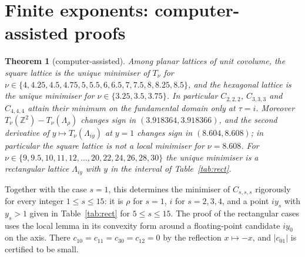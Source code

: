 \documentclass[10pt,twocolumn,a4paper]{article}
\newtheorem{theorem}{Theorem}
\theoremstyle{definition}
\newcommand{\Z}{\mathbb{Z}}
\begin{document}
\section{Finite exponents: computer-assisted proofs}\label{sec:finite}
\begin{theorem}[computer-assisted]\label{thm:finite}
Among planar lattices of unit covolume, the square lattice is the unique minimiser of $T_\nu$ for $\nu\in\{4,4.25,4.5,4.75,5,5.5,6,6.5,7,7.5,8,8.25,8.5\}$, and the hexagonal lattice is the unique minimiser for $\nu\in\{3.25,3.5,3.75\}$. In particular $C_{2,2,2}$, $C_{3,3,3}$ and $C_{4,4,4}$ attain their minimum on the fundamental domain only at $\tau=i$. Moreover $T_\nu(\Z^2)-T_\nu(\Lambda_\rho)$ changes sign in $(3.918364,3.918366)$, and the second derivative of $y\mapsto T_\nu(\Lambda_{iy})$ at $y=1$ changes sign in $(8.604,8.608)$; in particular the square lattice is not a local minimiser for $\nu=8.608$. For $\nu\in\{9,9.5,10,11,12,\dots,20,22,24,26,28,30\}$ the unique minimiser is a rectangular lattice $\Lambda_{iy}$ with $y$ in the interval of Table~\ref{tab:rect}.
\end{theorem}
Together with the case $s=1$, this determines the minimiser of $C_{s,s,s}$ rigorously for every integer $1\le s\le15$: it is $\rho$ for $s=1$, $i$ for $s=2,3,4$, and a point $iy_s$ with $y_s>1$ given in Table~\ref{tab:rect} for $5\le s\le15$. The proof of the rectangular cases uses the local lemma in its convexity form around a floating-point candidate $iy_0$ on the axis. There $c_{10}=c_{11}=c_{30}=c_{12}=0$ by the reflection $x\mapsto-x$, and $|c_{01}|$ is certified to be small.
\end{document}
